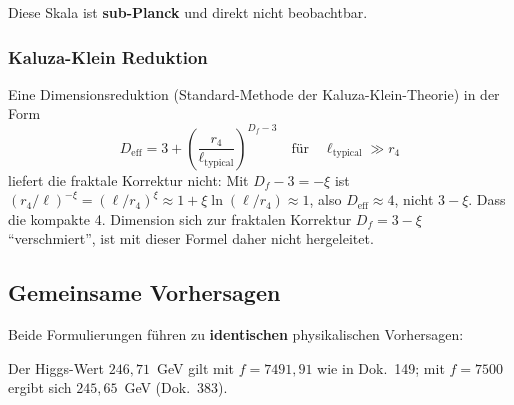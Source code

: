 	Diese Skala ist \textbf{sub-Planck} und direkt nicht beobachtbar.
	
	\subsubsection{Kaluza-Klein Reduktion}
	
	Eine Dimensionsreduktion (Standard-Methode der Kaluza-Klein-Theorie) in der Form
	\begin{equation}
		D_{\text{eff}} = 3 + \left(\frac{r_4}{\ell_{\text{typical}}}\right)^{D_f-3} \quad \text{für} \quad \ell_{\text{typical}} \gg r_4
	\end{equation}
	liefert die fraktale Korrektur nicht: Mit $D_f - 3 = -\xi$ ist $(r_4/\ell)^{-\xi} = (\ell/r_4)^{\xi} \approx 1 + \xi \ln(\ell/r_4) \approx 1$, also $D_{\text{eff}} \approx 4$, nicht $3 - \xi$. Dass die kompakte 4. Dimension sich zur fraktalen Korrektur $D_f = 3-\xi$ \enquote{verschmiert}, ist mit dieser Formel daher nicht hergeleitet.
	
	\subsection{Gemeinsame Vorhersagen}
	
	Beide Formulierungen führen zu \textbf{identischen} physikalischen Vorhersagen:
	
	\begin{table}[h]
		\centering
		\caption{Identische Vorhersagen beider Formulierungen}
	\end{table}

	Der Higgs-Wert $246{,}71$~GeV gilt mit $f = 7491{,}91$ wie in Dok.~149; mit $f = 7500$ ergibt sich $245{,}65$~GeV (Dok.~383).
	
